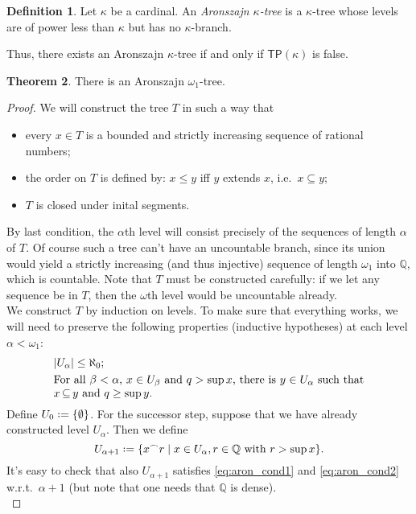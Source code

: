\documentclass[12pt,a4paper]{report}
\theoremstyle{definition}
\newtheorem{theorem}{Theorem}[chapter] %
\newtheorem{defn}[theorem]{Definition}
\theoremstyle{num.custom-title}
\DeclareMathOperator{\sse}{\subseteq}
\newcommand{\TP}{\ensuremath{\mathsf{TP}}\xspace}
\newcommand{\Q}{\mathbb{Q}}
\newcommand{\conc}{^\frown}
\newcommand*{\defeq}{\mathrel{\rlap{%
                     \raisebox{0.3ex}{$\cdot$}}%
                     \raisebox{-0.3ex}{$\cdot$}}%
                     =}
\begin{document}
\begin{defn}
Let $\kappa$ be a cardinal. An \emph{Aronszajn $\kappa$-tree} is a $\kappa$-tree whose levels are of power less than $\kappa$ but has no $\kappa$-branch.
\end{defn}
%
Thus, there exists an Aronszajn $\kappa$-tree if and only if $\TP(\kappa)$ is false.

\begin{theorem}\label{thm-aronszjan}
There is an Aronszajn $\omega_1$-tree.
\begin{proof}
We will construct the tree $T$ in such a way that

\begin{itemize}
\item every $x \in T$ is a bounded and strictly increasing sequence of rational numbers;
\item the order on $T$ is defined by: $x \leq y$ iff $y$ extends $x$, i.e.\ $x \sse y$;
\item $T$ is closed under inital segments.
\end{itemize}
%
By last condition, the $\alpha$th level will consist precisely of the sequences of length $\alpha$ of $T$. Of course such a tree can't have an uncountable branch, since its union would yield a strictly increasing (and thus injective) sequence of length $\omega_1$ into $\Q$, which is countable. Note that $T$ must be constructed carefully: if we let any sequence be in $T$, then the $\omega$th level would be uncountable already.\\
We construct $T$ by induction on levels. To make sure that everything works, we will need to preserve the following properties (inductive hypotheses) at each level $\alpha<\omega_1$:
%
\begin{align}
\label{eq:aron_cond1}
\begin{minipage}[t]{0.8\textwidth}
$|U_\alpha| \leq \aleph_0$;
\end{minipage}
\\
\label{eq:aron_cond2}
\begin{minipage}[t]{0.8\textwidth}
For all $\beta < \alpha$, $x \in U_\beta$ and $q > \sup x$, there is $y \in U_\alpha$ such that $x \sse y$ and $q \geq \sup y$.
\end{minipage}
\end{align}
%
Define $U_0 \defeq \{\emptyset\}$. For the successor step, suppose that we have already constructed level $U_\alpha$. Then we define
\[
U_{\alpha+1} \defeq \{ x \conc r \mid x \in U_\alpha, r \in \Q \text{ with } r > \sup x \}.
\]
It's easy to check that also $U_{\alpha+1}$ satisfies \eqref{eq:aron_cond1} and \eqref{eq:aron_cond2} w.r.t.\ $\alpha+1$ (but note that one needs that $\Q$ is dense).\\

\end{proof}
\end{theorem}
\end{document}
